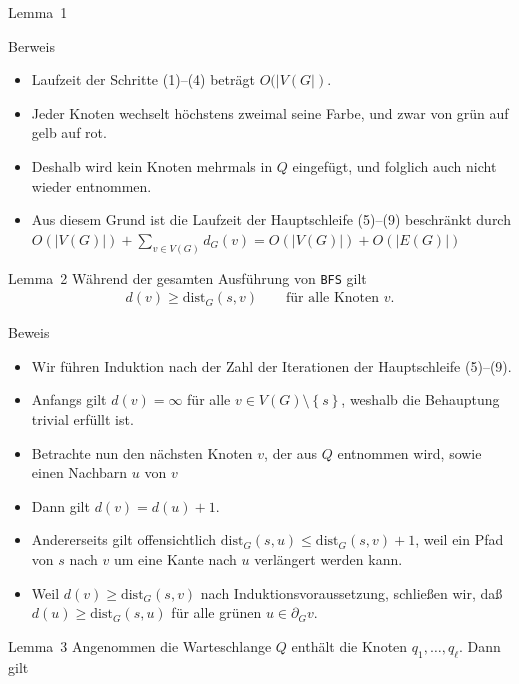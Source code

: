 \documentclass[aspectratio=1610, 11pt]{beamer}
\newcommand\dist{\mathrm{dist}}
\newcommand\cbc[1]{\left\{{#1}\right\}}
\begin{document}
\begin{frame}
\begin{overprint}
\begin{block}{Lemma~1}
		\end{block}
		\begin{exampleblock}{Berweis}
			\begin{itemize}
				\item Laufzeit der Schritte (1)--(4) betr\"agt $O(|V(G|)$.
				\item Jeder Knoten wechselt h\"ochstens zweimal seine Farbe, und zwar von gr\"un auf gelb auf rot.
				\item Deshalb wird kein Knoten mehrmals in $Q$ eingef\"ugt, und folglich auch nicht wieder entnommen.
				\item Aus diesem Grund ist die Laufzeit der Hauptschleife (5)--(9) beschr\"ankt durch $O(|V(G)|)+\sum_{v\in V(G)}d_G(v)=O(|V(G)|)+O(|E(G)|)$
			\end{itemize}
		\end{exampleblock}
		\begin{block}{Lemma~2}
			W\"ahrend der gesamten Ausf\"uhrung von {\tt BFS} gilt 
			\begin{align*}
				d(v)\geq\dist_G(s,v)\qquad\mbox{f\"ur alle Knoten $v$}.
			\end{align*}
		\end{block}
		\begin{exampleblock}{Beweis}
			\begin{itemize}
				\item Wir f\"uhren Induktion nach der Zahl der Iterationen der Hauptschleife (5)--(9).
				\item Anfangs gilt $d(v)=\infty$ f\"ur alle $v\in V(G)\setminus\cbc s$, weshalb die Behauptung trivial erf\"ullt ist.
				\item Betrachte nun den n\"achsten Knoten $v$, der aus $Q$ entnommen wird, sowie einen Nachbarn $u$ von $v$
				\item	Dann gilt $d(v)=d(u)+1$.
				\item Andererseits gilt offensichtlich $\dist_G(s,u)\leq\dist_G(s,v)+1$, weil ein Pfad von $s$ nach $v$ um eine Kante nach $u$ verl\"angert werden kann.
				\item Weil $d(v)\geq\dist_G(s,v)$ nach Induktionsvoraussetzung, schlie\ss en wir, da\ss\ $d(u)\geq\dist_G(s,u)$ f\"ur alle gr\"unen $u\in\partial_Gv$.
			\end{itemize}
		\end{exampleblock}
		\begin{block}{Lemma~3}
			Angenommen die Warteschlange $Q$ enth\"alt die Knoten $q_1,\ldots,q_\ell$.
			Dann gilt 
			\begin{align*}

\end{align*}
\end{block}
\end{overprint}
\end{frame}
\end{document}
